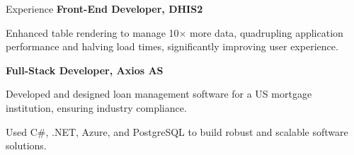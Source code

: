 \begin{rubric}{Experience}
%
\entry*[2017 -- 2018]%
\textbf{Front-End Developer, DHIS2} \par
\begin{compactitem}
    \item Enhanced table rendering to manage 10$\times$ more data, quadrupling application performance and halving load times, significantly improving user experience.
    \vspace{-12pt}
\end{compactitem}
%
\entry*[2014 -- 2016]%
\textbf{Full-Stack Developer, Axios AS} \par
\begin{compactitem}
    \item Developed and designed loan management software for a US mortgage institution, ensuring industry compliance.
    \item Used C\#, .NET, Azure, and PostgreSQL to build robust and scalable software solutions.
    \vspace{-12pt}
\end{compactitem}

%
\end{rubric}